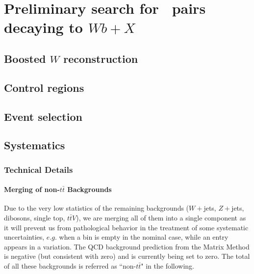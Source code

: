 \clearpage{\pagestyle{empty}\cleardoublepage}

\chapter{Preliminary search for \TTbar\ pairs decaying to $Wb+X$}\label{chap:wbx}

\section{Boosted $W$ reconstruction}\label{sec:boostedW}

\section{Control regions}\label{sec:wbxCR}

\section{Event selection}\label{sec:wbxEVT}



\section{Systematics}\label{sec:wbxSYS}

\subsection{Technical Details}

\subsubsection{Merging of non-$t\bar{t}$ Backgrounds}

Due to the very low statistics of the remaining backgrounds ($W+$jets, $Z+$jets, dibosons, single top, $t\bar{t}V$), we are merging all of them into a single component as it will prevent us from pathological behavior in the treatment of some systematic uncertainties, $e.g.$ when a bin is empty in the nominal case, while an entry appears in a variation. The QCD background prediction from the Matrix Method is negative (but consistent with zero) and is currently being set to zero. The total of all these backgrounds is referred as ``non-$t\bar{t}$" in the following. 


